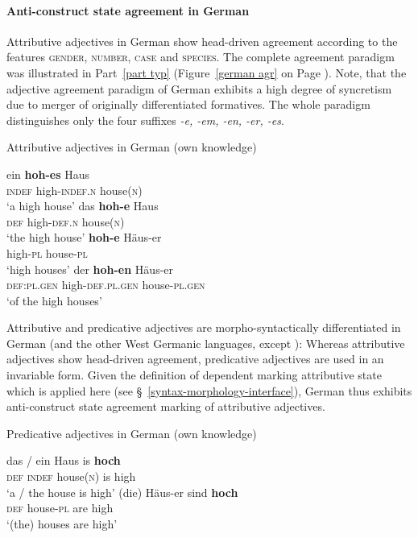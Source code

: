\paragraph{Anti-construct state agreement in German}
Attributive adjectives in German show head-driven agreement according to the features \textsc{gender, number, case} and \textsc{species}. The complete agreement paradigm was illustrated in Part~\ref{part typ} (Figure~\ref{german agr} on Page \pageref{german agr}). Note, that the adjective agreement paradigm of German exhibits a high degree of syncretism due to merger of originally differentiated formatives. The whole paradigm distinguishes only the four suffixes \textit{-e, -em, -en, -er, -es}.
\begin{exe}
\ex \rm{Attributive adjectives in German (own knowledge)}
\begin{xlist}
\ex
\gll	ein \textbf{hoh-es} Haus\\
	\textsc{indef} high-\textsc{indef.n} house(\textsc{n})\\
\glt	‘a high house’
\ex	
\gll	das \textbf{hoh-e} Haus\\
	\textsc{def} high-\textsc{def.n} house(\textsc{n})\\
\glt	‘the high house’
\ex	
\gll	\textbf{hoh-e} Häus-er\\
	high-\textsc{pl} house-\textsc{pl}\\
\glt	‘high houses’
\ex	
\gll	der \textbf{hoh-en} Häus-er\\
	\textsc{def:pl.gen} high-\textsc{def.pl.gen} house-\textsc{pl.gen}\\
\glt	‘of the high houses’
\end{xlist}
\end{exe}
Attributive and predicative adjectives are morpho-syntactically differentiated in German (and the other West Germanic languages, except ): Whereas attributive adjectives show head-driven agreement, predicative adjectives are used in an invariable form. Given the definition of dependent marking attributive state which is applied here (see \S~\ref{syntax-morphology-interface}), German thus exhibits anti-construct state agreement marking of attributive adjectives.
\begin{exe}
\ex \rm{Predicative adjectives in German (own knowledge)}
\begin{xlist}
\ex
\gll	das / ein Haus is \textbf{hoch}\\
	\textsc{def} {} \textsc{indef} house(\textsc{n}) is high\\
\glt	‘a / the house is high’
\ex	
\gll	(die) Häus-er sind \textbf{hoch}\\
	\textsc{def} house-\textsc{pl} are high\\
\glt	‘(the) houses are high’
\end{xlist}
\end{exe}

